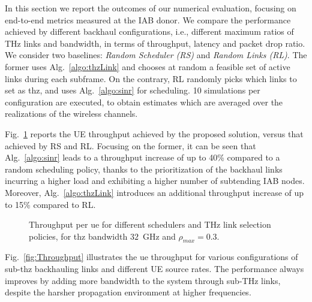 In this section we report the outcomes of our numerical evaluation, focusing on end-to-end metrics measured at the IAB donor. We compare the performance achieved by different backhaul configurations, i.e., different maximum ratios of THz links and bandwidth, in terms of throughput, latency and packet drop ratio. We consider two baselines: \textit{Random Scheduler (RS)} and \textit{Random Links (RL)}. The former uses Alg.~\ref{algo:thzLink} and chooses at random a feasible set of active links during each subframe. On the contrary, RL randomly picks which links to set as \gls{thz}, and uses Alg.~\ref{algo:sinr} for scheduling. 10 simulations per configuration are executed, to obtain estimates which are averaged over the realizations of the wireless channels.

Fig.~\ref{fig:ThroughputPerDifferAlg} reports the UE throughput achieved by the proposed solution, versus that achieved by RS and RL. Focusing on the former, it can be seen that Alg.~\ref{algo:sinr} leads to a throughput increase of up to 40\% compared to a random scheduling policy, thanks to the prioritization of the backhaul links incurring a higher load and exhibiting a higher number of subtending IAB nodes. 
Moreover, Alg.~\ref{algo:thzLink} introduces an additional throughput increase of up to 15\% compared to RL.
\begin{figure}[t!]
    \centering
    \setlength{}
    \setlength{}
    
    \caption{Throughput per \gls{ue} for different schedulers and THz link selection policies, for \gls{thz} bandwidth $32$~GHz and $\rho_{max} = 0.3$.} 
    \label{fig:ThroughputPerDifferAlg}
\end{figure}

Fig.~\ref{fig:Throughput} illustrates the \gls{ue} throughput for various configurations of sub-\gls{thz} backhauling links and different UE source rates. 
The performance always improves by adding more bandwidth to the system through sub-THz links, despite the harsher propagation environment at higher frequencies.

